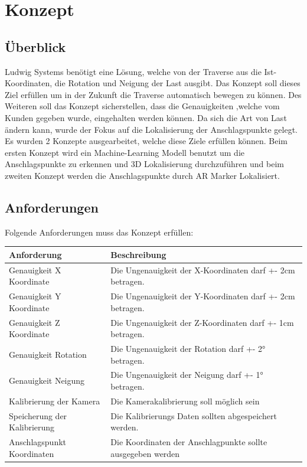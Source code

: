 \section{Konzept}


\subsection{Überblick}
Ludwig Systems benötigt eine Lösung, welche von der Traverse aus die Ist-Koordinaten, die Rotation und Neigung der Last ausgibt. Das Konzept soll dieses Ziel erfüllen um in der Zukunft die Traverse automatisch bewegen zu können. Des Weiteren soll das Konzept sicherstellen, dass die Genauigkeiten ,welche vom Kunden gegeben wurde, eingehalten werden können. 
Da sich die Art von Last ändern kann, wurde der Fokus auf die Lokalisierung der Anschlagspunkte gelegt. 
Es wurden 2 Konzepte ausgearbeitet, welche diese Ziele erfüllen können. Beim ersten Konzept wird ein Machine-Learning Modell benutzt um die Anschlagspunkte zu erkennen und 3D Lokalisierung durchzuführen und beim zweiten Konzept werden die Anschlagspunkte durch AR Marker 
Lokalisiert.

\subsection{Anforderungen}\label{requirements}

Folgende Anforderungen muss das Konzept erfüllen:

\begin{center}
\begin{tabular}{ |l|l|}
    \hline
    Anforderung                            & Beschreibung \\
    \hline
    Genauigkeit X Koordinate & Die Ungenauigkeit der X-Koordinaten darf +- 2cm betragen.\\
    \hline
    Genauigkeit Y Koordinate & Die Ungenauigkeit der Y-Koordinaten darf +- 2cm betragen. \\
    \hline
    Genauigkeit Z Koordinate & Die Ungenauigkeit der Z-Koordinaten darf +- 1cm betragen. \\
    \hline
    Genauigkeit Rotation & Die Ungenauigkeit der Rotation darf +- 2° betragen.\\
    \hline
    Genauigkeit Neigung & Die Ungenauigkeit der Neigung darf +- 1° betragen. \\
    \hline
    Kalibrierung der Kamera & Die Kamerakalibrierung soll möglich sein\\
    \hline
    Speicherung der Kalibrierung & Die Kalibrierungs Daten sollten abgespeichert werden. \\ 
    \hline
    Anschlagspunkt Koordinaten & Die Koordinaten der Anschlagpunkte sollte ausgegeben werden\\
    \hline
\end{tabular}
\end{center}



